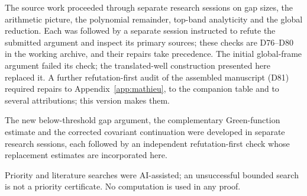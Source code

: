 The source work proceeded through separate research sessions on gap sizes, the arithmetic picture, the polynomial remainder, top-band analyticity and the global reduction. Each was followed by a separate session instructed to refute the submitted argument and inspect its primary sources; these checks are D76--D80 in the working archive, and their repairs take precedence. The initial global-frame argument failed its check; the translated-well construction presented here replaced it. A further refutation-first audit of the assembled manuscript (D81) required repairs to Appendix~\ref{app:mathieu}, to the companion table and to several attributions; this version makes them.

The new below-threshold gap argument, the complementary Green-function estimate and the corrected covariant continuation were developed in separate research sessions, each followed by an independent refutation-first check whose replacement estimates are incorporated here.

Priority and literature searches were AI-assisted; an unsuccessful bounded search is not a priority certificate. No computation is used in any proof.

\label{end:discussion}
